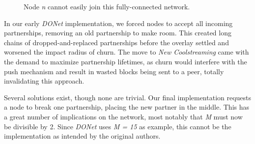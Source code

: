 \documentclass[12pt,a4paper]{article}
\begin{document}
\begin{figure}[!ht]
	\centering
	\caption{Node \textit{n} cannot easily join this fully-connected network.}
	\label{some label}
\end{figure}

In our early \textit{DONet} implementation, we forced nodes to accept all incoming partnerships, removing an old partnership to make room. This created long chains of dropped-and-replaced partnerships before the overlay settled and worsened the impact radius of churn. The move to \textit{New Coolstreaming} came with the demand to maximize partnership lifetimes, as churn would interfere with the push mechanism and result in wasted blocks being sent to a peer, totally invalidating this approach.

Several solutions exist, though none are trivial. Our final implementation requests a node to break one partnership, placing the new partner in the middle. This has a great number of implications on the network, most notably that \textit{M} must now be divisible by 2. Since \textit{DONet} uses \textit{M = 15} as example, this cannot be the implementation as intended by the original authors.
\end{document}
